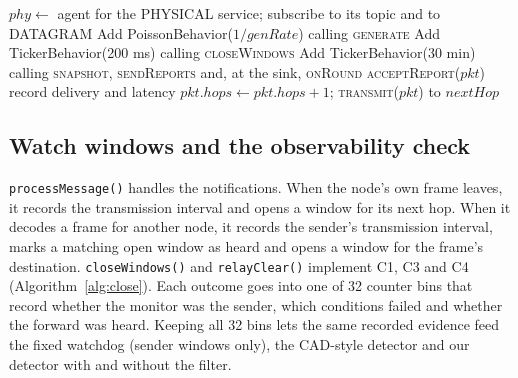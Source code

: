 \documentclass{article}
\begin{document}
\begin{algorithm}[htbp]
\small
\caption{\texttt{startup()} and \texttt{onPacket()} in \texttt{MonitorNode}}\label{alg:onpacket}
\begin{algorithmic}[1]
  \State $\mathit{phy} \gets$ agent for the PHYSICAL service; subscribe to its topic and to DATAGRAM
  \State Add PoissonBehavior($1/\mathit{genRate}$) calling \textsc{generate}
  \State Add TickerBehavior(200 ms) calling \textsc{closeWindows}
  \State Add TickerBehavior(30 min) calling \textsc{snapshot}, \textsc{sendReports} and, at the sink, \textsc{onRound}
\EndFunction
{}
     \State \textsc{acceptReport}($\mathit{pkt}$) \Else \State record delivery and latency \EndIf
    \State \Return
  \EndIf
   \State \Return {} \EndIf
  \State $\mathit{pkt}.\mathit{hops} \gets \mathit{pkt}.\mathit{hops}+1$; \textsc{transmit}($\mathit{pkt}$) to $\mathit{nextHop}$
\EndFunction
\end{algorithmic}
\end{algorithm}

\subsection{Watch windows and the observability check}
\noindent
\texttt{processMessage()} handles the notifications. When the node's own frame leaves, it records the transmission interval and opens a window for its next hop. When it decodes a frame for another node, it records the sender's transmission interval, marks a matching open window as heard and opens a window for the frame's destination. \texttt{closeWindows()} and \texttt{relayClear()} implement C1, C3 and C4 (Algorithm~\ref{alg:close}). Each outcome goes into one of 32 counter bins that record whether the monitor was the sender, which conditions failed and whether the forward was heard. Keeping all 32 bins lets the same recorded evidence feed the fixed watchdog (sender windows only), the CAD-style detector and our detector with and without the filter.
\end{document}
